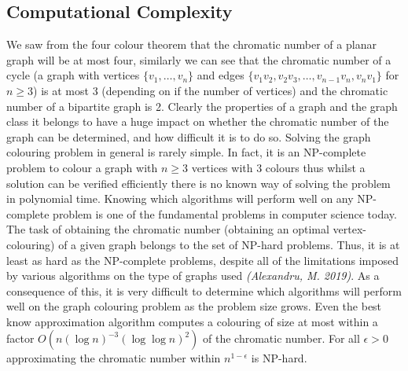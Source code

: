 \documentclass[12pt,a4paper]{article}
\begin{document}
\subsection*{Computational Complexity}
\noindent
We saw from the four colour theorem that the chromatic number of a planar graph will be at most four, similarly we can see that the chromatic number of a cycle (a graph with vertices $\{v_1, \dots, v_n\}$ and edges $\{v_1v_2, v_2v_3, \dots , v_{n-1}v_n, v_nv_1\}$ for $n\geq 3$) is at most 3 (depending on if the number of vertices) and the chromatic number of a bipartite graph is 2. Clearly the properties of a graph and the graph class it belongs to have a huge impact on whether the chromatic number of the graph can be determined, and how difficult it is to do so. Solving the graph colouring problem in general is rarely simple. In fact, it is an NP-complete problem to colour a graph with $n \geq 3$ vertices with $3$ colours thus whilst a solution can be verified efficiently there is no known way of solving the problem in polynomial time. Knowing which algorithms will perform well on any NP-complete problem is one of the fundamental problems in computer science today. The task of obtaining the chromatic number (obtaining an optimal vertex-colouring) of a given graph belongs to the set of NP-hard problems. Thus, it is at least as hard as the NP-complete problems, despite all of the limitations imposed by various algorithms on the type of graphs used \textit{(Alexandru, M. 2019)}.  As a consequence of this, it is very difficult to determine which algorithms will perform well on the graph colouring problem as the problem size grows. Even the best know approximation algorithm computes a colouring of size at most within a factor $O(n(\log n)^{- 3}(\log \log n)^2)$ of the chromatic number. For all $\epsilon >0$ approximating the chromatic number within $n^{1-\epsilon}$ is NP-hard.
\end{document}
